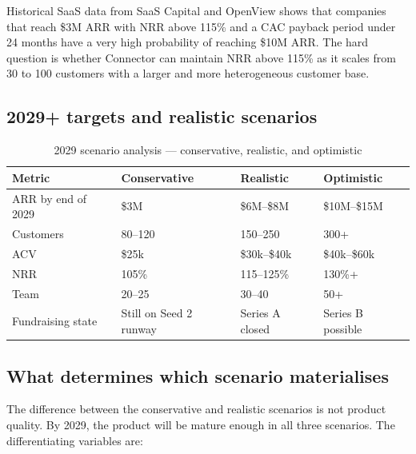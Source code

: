 Historical SaaS data from SaaS Capital and OpenView shows that companies that
reach \$3M ARR with NRR above 115\% and a CAC payback period under 24 months
have a very high probability of reaching \$10M ARR. The hard question is whether
Connector can maintain NRR above 115\% as it scales from 30 to 100 customers
with a larger and more heterogeneous customer base.

\subsection{2029+ targets and realistic scenarios}

\begin{table}[H]
\centering
\renewcommand{\arraystretch}{1.5}
\begin{tabularx}{\textwidth}{@{}lXXX@{}}
\toprule
\textbf{Metric} & \textbf{Conservative} & \textbf{Realistic} & \textbf{Optimistic} \\
\midrule
ARR by end of 2029 & \$3M & \$6M--\$8M & \$10M--\$15M \\
Customers & 80--120 & 150--250 & 300+ \\
ACV & \$25k & \$30k--\$40k & \$40k--\$60k \\
NRR & 105\% & 115--125\% & 130\%+ \\
Team & 20--25 & 30--40 & 50+ \\
Fundraising state & Still on Seed 2 runway & Series A closed & Series B possible \\
\bottomrule
\end{tabularx}
\caption{2029 scenario analysis — conservative, realistic, and optimistic}
\end{table}

\subsection{What determines which scenario materialises}

The difference between the conservative and realistic scenarios is not product
quality. By 2029, the product will be mature enough in all three scenarios. The
differentiating variables are:

